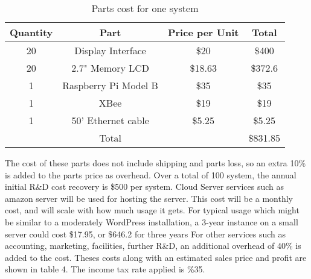 \documentclass[PPFS.tex]{template/subfiles}
\begin{document}
        \begin{table}[h!]
        	\begin{center}
        		\caption{Parts cost for one system}
        		\begin{tabular}{|c|c|c|c|}
        			\hline
        			Quantity & Part & Price per Unit & Total\\
        			\hline
        			20 & Display Interface & \$20 & \$400\\
        			\hline
        			20 & 2.7" Memory LCD & \$18.63 \cite{mouserMemoryLCD} & \$372.6\\
        			\hline
        			1 & Raspberry Pi Model B & \$35 \cite{alliedRaspberryPi} & \$35\\
        			\hline
        			1 & XBee & \$19 \cite{mouserXBEE} & \$19\\
        			\hline
        			1 & 50' Ethernet cable & \$5.25 \cite{amazonEthernetCable} & \$5.25\\
        			\hline
        			&Total&& \$831.85\\
        			\hline
        		\end{tabular}
        	\end{center}
        \end{table}
        
        The cost of these parts does not include shipping and parts loss, so an extra 10\% is added to the parts price as overhead. 
        Over a total of 100 system, the annual initial R\&D cost recovery is \$500 per system.
        Cloud Server services such as amazon server will be used for hosting the server. This cost will be a monthly cost, and will scale with how much usage it gets. For typical usage which might be similar to a moderately WordPress installation, a 3-year instance on a small server could cost \$17.95, or \$646.2 for three years \cite{wordPressEstimate}
        For other services such as accounting, marketing, facilities, further R\&D, an additional overhead of 40\% is added to the cost.
        Theses costs along with an estimated sales price and profit are shown in table 4. The income tax rate applied is \%35.
        
\end{document}
